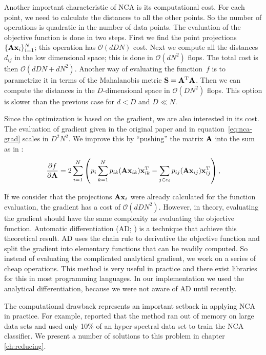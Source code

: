 	Another important characteristic of NCA is its computational cost. For each point, we need to calculate the distances to all the other points. So the number of operations is quadratic in the number of data points. The evaluation of the objective function is done in two steps. First we find the point projections $\{\mathbf{A}\mathbf{x}_i\}_{i=1}^N$; this operation has $\mathcal{O}(dDN)$ cost. Next we compute all the distances~$d_{ij}$ in the low dimensional space; this is done in $\mathcal{O}(dN^2)$ flops. The total cost is then $\mathcal{O}(dDN+dN^2)$. Another way of evaluating the function~$f$ is to parametrize it in terms of the Mahalanobis metric $\mathbf{S}=\mathbf{A}^\textrm{T}\mathbf{A}$. Then we can compute the distances in the $D$-dimensional space in $\mathcal{O}(DN^2)$ flops. This option is slower than the previous case for $d<D$ and $D\ll N$.

	Since the optimization is based on the gradient, we are also interested in its cost. The evaluation of gradient given in the original paper and in equation~\eqref{eq:nca-grad} scales in $D^2N^2$. We improve this by ``pushing'' the matrix $\mathbf{A}$ into the sum as in \citep{singh2010}:
	\begin{align}
	  \frac{\partial f}{\partial	\mathbf{A}}=2\sum_{i=1}^{N}\left(p_i\sum_{k=1}^Np_{ik}(\mathbf{A}\mathbf{x}_{ik})\mathbf{x}_{ik}^{\textrm{T}} -
	\sum_{j\in c_i}p_{ij}(\mathbf{A}\mathbf{x}_{ij})\mathbf{x}_{ij}^{\textrm{T}} \right)\label{eq:nca-grad-alt},
	\end{align}

	If we consider that the projections $\mathbf{A}\mathbf{x}_i$ were already calculated for the function evaluation, the gradient has a cost of $\mathcal{O}(dDN^2)$. However, in theory, evaluating the gradient should have the same complexity as evaluating the objective function. Automatic differentiation (AD; \citealp{rall1981}) is a technique that achieve this theoretical result. AD uses the chain rule to derivative the objective function and split the gradient into elementary functions that can be readily computed. So instead of evaluating the complicated analytical gradient, we work on a series of cheap operations. This method is very useful in practice and there exist libraries for this in most programming languages. In our implementation we used the analytical differentiation, because we were not aware of AD until recently.
	
	The computational drawback represents an important setback in applying NCA in practice. For example, \citet{weinberger2007} reported that the method ran out of memory on large data sets and \citet{weizman2007} used only 10\% of an hyper-spectral data set to train the NCA classifier. We present a number of solutions to this problem in chapter \ref{ch:reducing}. 
	
